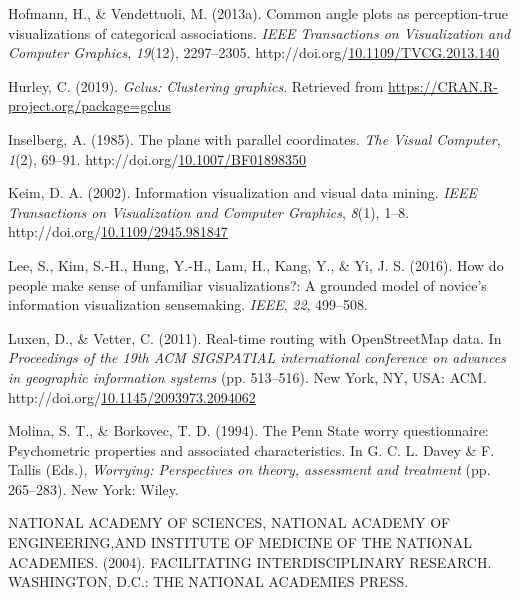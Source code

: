 \documentclass[print]{nuthesis}
\newlength{\cslhangindent}
\newenvironment{CSLReferences}[2]%
{\setlength{\parindent}{0pt}%
\everypar{\setlength{\hangindent}{\cslhangindent}}\ignorespaces}%
{\par}
\begin{document}
\begin{CSLReferences}{1}{0}
\leavevmode{}%
Hofmann, H., \& Vendettuoli, M. (2013a). Common angle plots as perception-true visualizations of categorical associations. \emph{IEEE Transactions on Visualization and Computer Graphics}, \emph{19}(12), 2297--2305. http://doi.org/\href{https://doi.org/10.1109/TVCG.2013.140}{10.1109/TVCG.2013.140}

\leavevmode{}%
Hurley, C. (2019). \emph{Gclus: Clustering graphics}. Retrieved from \url{https://CRAN.R-project.org/package=gclus}

\leavevmode{}%
Inselberg, A. (1985). {The plane with parallel coordinates}. \emph{The Visual Computer}, \emph{1}(2), 69--91. http://doi.org/\href{https://doi.org/10.1007/BF01898350}{10.1007/BF01898350}

\leavevmode{}%
Keim, D. A. (2002). Information visualization and visual data mining. \emph{IEEE Transactions on Visualization and Computer Graphics}, \emph{8}(1), 1--8. http://doi.org/\href{https://doi.org/10.1109/2945.981847}{10.1109/2945.981847}

\leavevmode{}%
Lee, S., Kim, S.-H., Hung, Y.-H., Lam, H., Kang, Y., \& Yi, J. S. (2016). How do people make sense of unfamiliar visualizations?: A grounded model of novice's information visualization sensemaking. \emph{IEEE}, \emph{22}, 499--508.

\leavevmode{}%
Luxen, D., \& Vetter, C. (2011). Real-time routing with OpenStreetMap data. In \emph{Proceedings of the 19th ACM SIGSPATIAL international conference on advances in geographic information systems} (pp. 513--516). New York, NY, USA: ACM. http://doi.org/\href{https://doi.org/10.1145/2093973.2094062}{10.1145/2093973.2094062}

\leavevmode{}%
Molina, S. T., \& Borkovec, T. D. (1994). The {P}enn {S}tate worry questionnaire: Psychometric properties and associated characteristics. In G. C. L. Davey \& F. Tallis (Eds.), \emph{Worrying: Perspectives on theory, assessment and treatment} (pp. 265--283). New York: Wiley.

\leavevmode{}%
NATIONAL ACADEMY OF SCIENCES, NATIONAL ACADEMY OF ENGINEERING,AND INSTITUTE OF MEDICINE OF THE NATIONAL ACADEMIES. (2004). FACILITATING INTERDISCIPLINARY RESEARCH. WASHINGTON, D.C.: THE NATIONAL ACADEMIES PRESS.


\end{CSLReferences}
\end{document}
